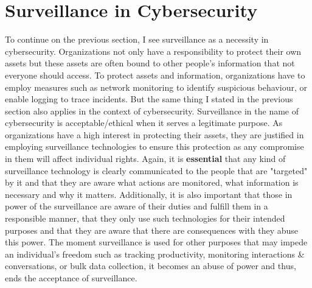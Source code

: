 \documentclass[12pt]{article}
\begin{document}
\section{Surveillance in Cybersecurity}
To continue on the previous section, I see surveillance as a necessity in cybersecurity. Organizations not only have a responsibility to protect their own assets but these assets are often bound to other people's information that not everyone should access. To protect assets and information, organizations have to employ measures such as network monitoring to identify suspicious behaviour, or enable logging to trace incidents. 
\newline
But the same thing I stated in the previous section also applies in the context of cybersecurity. Surveillance in the name of cybersecurity is acceptable/ethical when it serves a legitimate purpose. As organizations have a high interest in protecting their assets, they are justified in employing surveillance technologies to ensure this protection as any compromise in them will affect individual rights.
\newline
Again, it is \textbf{essential} that any kind of surveillance technology is clearly communicated to the people that are "targeted" by it and that they are aware what actions are monitored, what information is necessary and why it matters. Additionally, it is also important that those in power of the surveillance are aware of their duties and fulfill them in a responsible manner, that they only use such technologies for their intended purposes and that they are aware that there are consequences with they abuse this power.
\newline
The moment surveillance is used for other purposes that may impede an individual's freedom such as tracking productivity, monitoring interactions \& conversations, or bulk data collection, it becomes an abuse of power and thus, ends the acceptance of surveillance.
\end{document}
